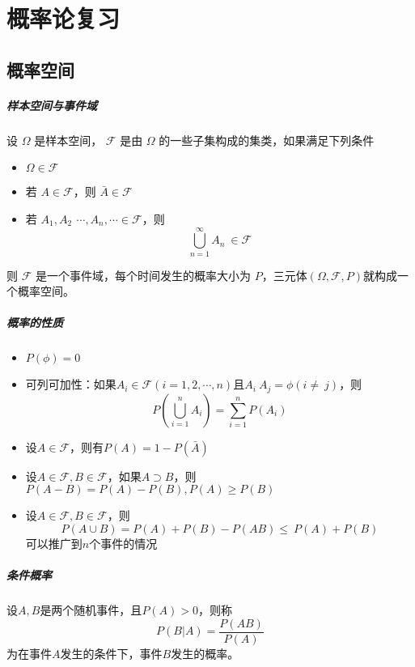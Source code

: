 \chapter{概率论复习}

\section{概率空间}

\paragraph{样本空间与事件域}
设 $\Omega$ 是样本空间， $\mathcal{F}$ 是由 $\Omega$ 的一些子集构成的集类，如果满足下列条件
\begin{itemize}[leftmargin=\paritemindent]
    \item $\Omega \in \mathcal{F}$
    \item 若 $A\in\mathcal{F}$，则 $\bar{A}\in\mathcal{F}$
    \item 若 $A_1,A_2\ \,\cdots,A_n,\cdots\in\mathcal{F}$，则
     $$ \bigcup_{n=1}^\infty A_n\ \in\mathcal{F} $$ 
\end{itemize}
则 $\mathcal{F}$ 是一个事件域，每个时间发生的概率大小为 $P$，三元体$(\Omega,\mathcal{F},P)$就构成一个概率空间。

\paragraph{概率的性质}
\begin{itemize}[leftmargin=\paritemindent]
    \item $P(\phi)=0$
	\item 可列可加性：如果$A_i\in\mathcal{F}(i=1,2,\cdots,n)$且$A_i\ A_j=\phi(i\neq\ j)$，则
     $$ P\left(\bigcup_{i=1}^n A_i \right)=\sum_{i=1}^n P(A_i )  $$ 
    \item 设$A\in\mathcal{F}$，则有$P(A)=1-P(\bar{A})$
    \item 设$A\in\mathcal{F},B\in\mathcal{F}$，如果$A\supset B$，则$P(A-B)=P(A)-P(B),P(A)\geq P(B)$
    \item 设$A\in\mathcal{F},B\in\mathcal{F}$，则
     $$ P(A\cup B)=P(A)+P(B)-P(AB)\le\ P(A)+P(B) $$ 
    可以推广到$n$个事件的情况
\end{itemize}

\paragraph{条件概率} 设$A,B$是两个随机事件，且$P(A)>0$，则称
\begin{equation}
    P(B | A)=\frac{P(AB)}{P(A)}
\end{equation}
为在事件$A$发生的条件下，事件$B$发生的概率。

